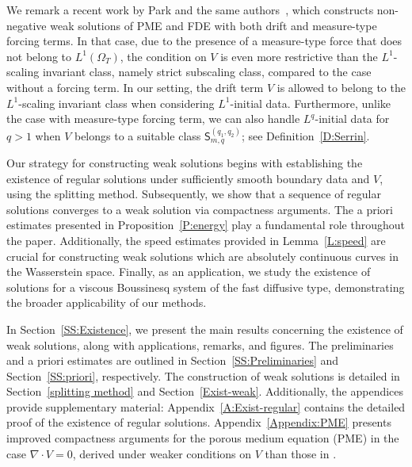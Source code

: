 \documentclass{amsart}
\numberwithin{equation}{section}
\begin{document}

We remark a recent work by Park and the same authors~\cite{HKKP}, which constructs non-negative weak solutions of PME and FDE with both drift and measure-type forcing terms. In that case, due to the presence of a measure-type force that does not belong to \( L^1(\Omega_T) \), the condition on \( V \) is even more restrictive than the \( L^1 \)-scaling invariant class, namely strict subscaling class, compared to the case without a forcing term.
In our setting, the drift term \( V \) is allowed to belong to the \( L^1 \)-scaling invariant class when considering \( L^1 \)-initial data. Furthermore, unlike the case with measure-type forcing term, we can also handle \( L^q \)-initial data for \( q > 1 \) when \( V \) belongs to a suitable class \( \mathsf{S}_{m,q}^{(q_1,q_2)} \); see Definition~\ref{D:Serrin}.


Our strategy for constructing weak solutions begins with establishing the existence of regular solutions under sufficiently smooth boundary data and \( V \), using the splitting method. Subsequently, we show that a sequence of regular solutions converges to a weak solution via compactness arguments. The a priori estimates presented in Proposition~\ref{P:energy} play a fundamental role throughout the paper. Additionally, the speed estimates provided in Lemma~\ref{L:speed} are crucial for constructing weak solutions which are absolutely continuous curves in the Wasserstein space. Finally, as an application, we study the existence of solutions for a viscous Boussinesq system of the fast diffusive type, demonstrating the broader applicability of our methods.
   
In Section~\ref{SS:Existence}, we present the main results concerning the existence of weak solutions, along with applications, remarks, and figures. The preliminaries and a priori estimates are outlined in Section~\ref{SS:Preliminaries} and Section~\ref{SS:priori}, respectively. The construction of weak solutions is detailed in Section~\ref{splitting method} and Section~\ref{Exist-weak}. Additionally, the appendices provide supplementary material: Appendix~\ref{A:Exist-regular} contains the detailed proof of the existence of regular solutions. Appendix~\ref{Appendix:PME} presents improved compactness arguments for the porous medium equation (PME) in the case $\nabla \cdot V =0$, derived under weaker conditions on $V$ than those in \cite{HKK02}.

\end{document}
